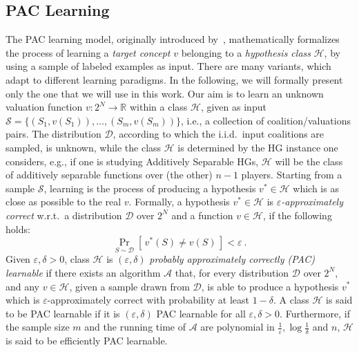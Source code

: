 \documentclass[letterpaper]{article} %
\let\eps\varepsilon
\newcommand{\distribution}{\mathcal{D}}
\newcommand{\Prob}[2]{\Pr_{#2}\left[\,#1\,\right]}
\newcommand{\RR}{\ensuremath{\mathbb{R}}}
\newcommand{\hclass}{\ensuremath{\mathcal{H}}}
\newcommand{\sample}{\ensuremath{\mathcal{S}}}
\begin{document}
\subsection{PAC Learning}
The PAC learning model, originally introduced by~\citet{Valiant84}, mathematically formalizes the process of learning a \emph{target concept} $v$ belonging to a \emph{hypothesis class} $\hclass$, by using a sample of labeled examples as input. There are many variants, which adapt to different learning paradigms. In the following, we will formally present only the one that we will use in this work.
Our aim is to learn an unknown valuation function $v:2^N \rightarrow \RR$ within a class $\hclass$, given as input $\sample = \{( S_1, v(S_1)), \ldots, (S_m, v(S_m))\}$, i.e., a collection of coalition/valuations pairs.
The distribution $\distribution$, according to which the i.i.d.\ input coalitions are sampled, is unknown, while the class $\hclass$ is determined by the HG instance one considers, e.g., if one is studying Additively Separable HGs, $\hclass$ will be the class of additively separable functions over (the other) $n-1$ players.
Starting from a sample $\sample$, learning is the process of producing a hypothesis $v^* \in \hclass$ which is as close as possible to the real $v$.
Formally, a hypothesis $v^* \in \hclass$ is \emph{$\eps$-approximately correct} w.r.t.\ a distribution $\distribution$ over $2^N$ and a function $v \in \hclass$, if the following holds:
\begin{equation*}
    \Prob{v^*(S) \neq v(S)}{S\sim \distribution} < \eps \ .
\end{equation*}
Given $\eps, \delta >0$, class $\hclass$ is $(\eps, \delta)$ \emph{probably approximately correctly (PAC) learnable} if there exists an algorithm $\mathcal{A}$ that, for every distribution $\distribution$ over $2^N$, and any $v \in \hclass$, given a sample drawn from $\distribution$, is able to produce a hypothesis $v^*$ which is $\eps$-approximately correct with probability at least $1-\delta$. A class $\hclass$ is said to be PAC learnable if it is $(\eps, \delta)$ PAC learnable for all $\eps, \delta >0$. Furthermore, if the sample size $m$ and the running time of $\mathcal{A}$ are polynomial in $\frac{1}{\eps}, \log{\frac{1}{\delta}}$ and $n$, $\hclass$ is said to be efficiently PAC learnable.
\end{document}
